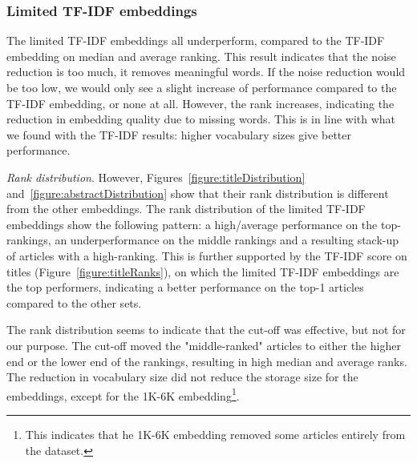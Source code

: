\documentclass[../../Thesis.tex]{subfiles}
\begin{document}
\subsubsection{Limited TF-IDF embeddings}
The limited TF-IDF embeddings all underperform, compared to the TF-IDF embedding on median and average ranking. This result indicates that the noise reduction is too much, it removes meaningful words. If the noise reduction would be too low, we would only see a slight increase of performance compared to the TF-IDF embedding, or none at all. However, the rank increases, indicating the reduction in embedding quality due to missing words. This is in line with what we found with the TF-IDF results: higher vocabulary sizes give better performance. 
\begin{jumpin}
\textit{Rank distribution}.
However, Figures~\ref{figure:titleDistribution} and~\ref{figure:abstractDistribution} show that their rank distribution is different from the other embeddings. The rank distribution of the limited TF-IDF embeddings show the following pattern: a high/average performance on the top-rankings, an underperformance on the middle rankings and a resulting stack-up of articles with a high-ranking. This is further supported by the TF-IDF score on titles (Figure~\ref{figure:titleRanks}), on which the limited TF-IDF embeddings are the top performers, indicating a better performance on the top-1 articles compared to the other sets.
\end{jumpin}
The rank distribution seems to indicate that the cut-off was effective, but not for our purpose. The cut-off moved the "middle-ranked"  articles to either the higher end or the lower end of the rankings, resulting in high median and average ranks. The reduction in vocabulary size did not reduce the storage size for the embeddings, except for the 1K-6K embedding\footnote{This indicates that he 1K-6K embedding removed some articles entirely from the dataset.}.
\end{document}
